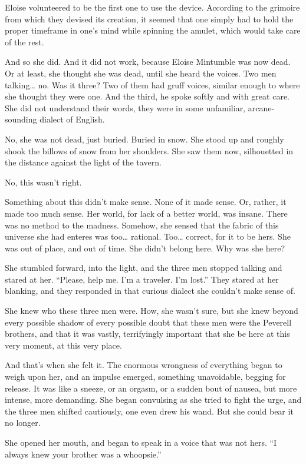 Eloise volunteered to be the first one to use the device. According to the grimoire from which they devised its creation, it seemed that one simply had to hold the proper timeframe in one’s mind while spinning the amulet, which would take care of the rest.

And so she did. And it did not work, because Eloise Mintumble was now dead. Or at least, she thought she was dead, until she heard the voices. Two men talking… no. Was it three? Two of them had gruff voices, similar enough to where she thought they were one. And the third, he spoke softly and with great care. She did not understand their words, they were in some unfamiliar, arcane-sounding dialect of English.

No, she was not dead, just buried. Buried in snow. She stood up and roughly shook the billows of snow from her shoulders. She saw them now, silhouetted in the distance against the light of the tavern.

No, this wasn’t right.

Something about this didn’t make sense. None of it made sense. Or, rather, it made too much sense. Her world, for lack of a better world, was insane. There was no method to the madness. Somehow, she sensed that the fabric of this universe she had enteres was too… rational. Too… correct, for it to be hers. She was out of place, and out of time. She didn’t belong here. Why was she here?

She stumbled forward, into the light, and the three men stopped talking and stared at her. “Please, help me. I’m a traveler. I’m lost.” They stared at her blanking, and they responded in that curious dialect she couldn’t make sense of.

She knew who these three men were. How, she wasn’t sure, but she knew beyond every possible shadow of every possible doubt that these men were the Peverell brothers, and that it was vastly, terrifyingly important that she be here at this very moment, at this very place.

And that’s when she felt it. The enormous wrongness of everything began to weigh upon her, and an impulse emerged, something unavoidable, begging for release. It was like a sneeze, or an orgasm, or a sudden bout of nausea, but more intense, more demanding. She began convulsing as she tried to fight the urge, and the three men shifted cautiously, one even drew his wand. But she could bear it no longer.

She opened her mouth, and began to speak in a voice that was not hers.
\simpleline
{}
“I always knew your brother was a whoopsie.”

